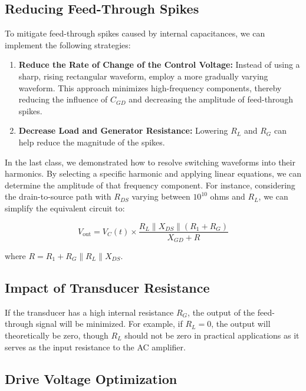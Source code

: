 \subsection{Reducing Feed-Through Spikes}

To mitigate feed-through spikes caused by internal capacitances, we can implement the following strategies:

\begin{enumerate}
    \item \textbf{Reduce the Rate of Change of the Control Voltage:} Instead of using a sharp, rising rectangular waveform, employ a more gradually varying waveform. This approach minimizes high-frequency components, thereby reducing the influence of \( C_{GD} \) and decreasing the amplitude of feed-through spikes.
    
    \item \textbf{Decrease Load and Generator Resistance:} Lowering \( R_L \) and \( R_G \) can help reduce the magnitude of the spikes. 
\end{enumerate}

In the last class, we demonstrated how to resolve switching waveforms into their harmonics. By selecting a specific harmonic and applying linear equations, we can determine the amplitude of that frequency component. For instance, considering the drain-to-source path with \( R_{DS} \) varying between \( 10^{10} \) ohms and \( R_L \), we can simplify the equivalent circuit to:

\[
V_{\text{out}} = V_C(t) \times \frac{R_L \parallel X_{DS} \parallel (R_1 + R_G)}{X_{GD} + R}
\]

where \( R = R_1 + R_G \parallel R_L \parallel X_{DS} \).

\subsection{Impact of Transducer Resistance}

If the transducer has a high internal resistance \( R_G \), the output of the feed-through signal will be minimized. For example, if \( R_L = 0 \), the output will theoretically be zero, though \( R_L \) should not be zero in practical applications as it serves as the input resistance to the AC amplifier.

\subsection{Drive Voltage Optimization}

